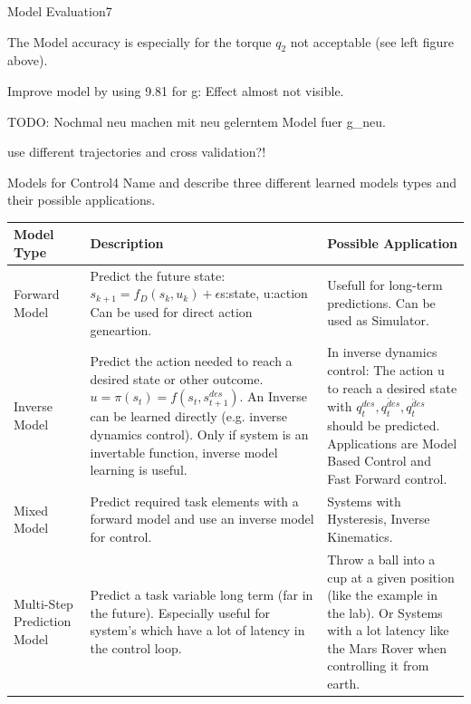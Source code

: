 \begin{questions}
\begin{question}{Model Evaluation}{7}
\begin{answer}
	The Model accuracy is especially for the torque $q_2$ not acceptable (see left figure above).
	
	Improve model by using 9.81 for g: Effect almost not visible.
	
	TODO:
	Nochmal neu machen mit neu gelerntem Model fuer g\_neu.
	
	use different trajectories and cross validation?! 
	
\end{answer}

\end{question}



\begin{question}[bonus]{Models for Control}{4}
Name and describe three different learned models types and their possible applications.
\end{question}
\begin{answer}

\begin{tabular}{|p{4cm}|p{7cm}|p{5cm}|}
		\hline
		Model Type&Description  &Possible Application \\
		\hline
				Forward Model &Predict the future state: $s_{k+1}=f_D(s_k,u_k)+\epsilon$s:state, u:action Can be used for direct action geneartion.  &Usefull for long-term predictions. Can be used as Simulator.
			\\	\hline
			Inverse Model &Predict the action needed to reach a desired state or other outcome. $u=\pi(s_t)=f(s_t,s_{t+1}^{des})$. An Inverse can be learned directly (e.g. inverse dynamics control). Only if system is an invertable function, inverse model learning is useful.&In inverse dynamics control: The action u to reach a desired state with $q_t^{des}, \dot{q_t^{des}},\ddot{q_t^{des}}$ should be predicted. Applications are Model Based Control and Fast Forward control. 	 \\	 \hline 

		Mixed Model&Predict required task elements with a forward model and use an inverse model for control.&Systems with Hysteresis, Inverse Kinematics. \\  \hline
		
		Multi-Step Prediction Model&Predict a task variable long term (far in the future). Especially useful for system's which have a lot of latency in the control loop.                                      &Throw a ball into a cup at a given position (like the example in the lab). Or Systems with a lot latency like the Mars Rover when controlling it from earth.  \\ \hline
\end{tabular}
	
	\end{answer}




\end{questions}
